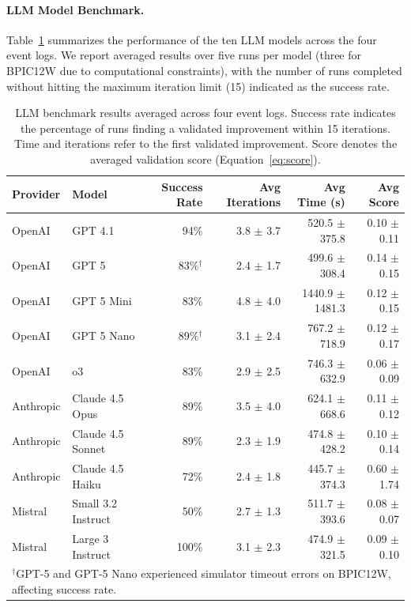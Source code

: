 \documentclass[preprint,12pt]{elsarticle}
\begin{document}
\paragraph{LLM Model Benchmark.}
Table~\ref{tab:llm_benchmark} summarizes the performance of the ten LLM models across the four event logs. We report averaged results over five runs per model (three for BPIC12W due to computational constraints), with the number of runs completed without hitting the maximum iteration limit (15) indicated as the success rate.

\begin{table}[!t]
\centering
\caption{LLM benchmark results averaged across four event logs. Success rate indicates the percentage of runs finding a validated improvement within 15 iterations. Time and iterations refer to the first validated improvement. Score denotes the averaged validation score (Equation~\ref{eq:score}).}
\label{tab:llm_benchmark}
\begin{tabular}{@{}llrrrr@{}}
\toprule
\textbf{Provider} & \textbf{Model} & \textbf{Success Rate} & \textbf{Avg Iterations} & \textbf{Avg Time (s)} & \textbf{Avg Score} \\
\midrule
OpenAI & GPT 4.1 & 94\% & 3.8 $\pm$ 3.7 & 520.5 $\pm$ 375.8 & 0.10 $\pm$ 0.11 \\
OpenAI & GPT 5 & 83\%$^\dagger$ & 2.4 $\pm$ 1.7 & 499.6 $\pm$ 308.4 & 0.14 $\pm$ 0.15 \\
OpenAI & GPT 5 Mini & 83\% & 4.8 $\pm$ 4.0 & 1440.9 $\pm$ 1481.3 & 0.12 $\pm$ 0.15 \\
OpenAI & GPT 5 Nano & 89\%$^\dagger$ & 3.1 $\pm$ 2.4 & 767.2 $\pm$ 718.9 & 0.12 $\pm$ 0.17 \\
OpenAI & o3 & 83\% & 2.9 $\pm$ 2.5 & 746.3 $\pm$ 632.9 & 0.06 $\pm$ 0.09 \\
\midrule
Anthropic & Claude 4.5 Opus & 89\% & 3.5 $\pm$ 4.0 & 624.1 $\pm$ 668.6 & 0.11 $\pm$ 0.12 \\
Anthropic & Claude 4.5 Sonnet & 89\% & 2.3 $\pm$ 1.9 & 474.8 $\pm$ 428.2 & 0.10 $\pm$ 0.14 \\
Anthropic & Claude 4.5 Haiku & 72\% & 2.4 $\pm$ 1.8 & 445.7 $\pm$ 374.3 & 0.60 $\pm$ 1.74 \\
\midrule
Mistral & Small 3.2 Instruct & 50\% & 2.7 $\pm$ 1.3 & 511.7 $\pm$ 393.6 & 0.08 $\pm$ 0.07 \\
Mistral & Large 3 Instruct & 100\% & 3.1 $\pm$ 2.3 & 474.9 $\pm$ 321.5 & 0.09 $\pm$ 0.10 \\
\bottomrule
\multicolumn{6}{l}{\footnotesize $^\dagger$GPT-5 and GPT-5 Nano experienced simulator timeout errors on BPIC12W, affecting success rate.}
\end{tabular}
\end{table}
\end{document}
